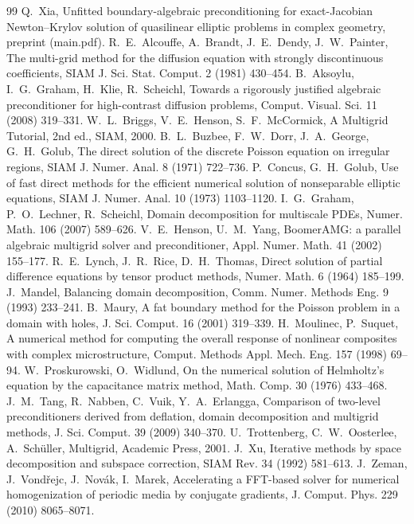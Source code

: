 \documentclass[11pt,a4paper]{ctexart}
\begin{document}
\begin{thebibliography}{99}\small
{} Q.~Xia, Unfitted boundary-algebraic preconditioning for exact-Jacobian Newton--Krylov solution of quasilinear elliptic problems in complex geometry, preprint (main.pdf).
 R.~E.~Alcouffe, A.~Brandt, J.~E.~Dendy, J.~W.~Painter, The multi-grid method for the diffusion equation with strongly discontinuous coefficients, SIAM J. Sci. Stat. Comput. 2 (1981) 430--454.
 B.~Aksoylu, I.~G.~Graham, H.~Klie, R.~Scheichl, Towards a rigorously justified algebraic preconditioner for high-contrast diffusion problems, Comput. Visual. Sci. 11 (2008) 319--331.
 W.~L.~Briggs, V.~E.~Henson, S.~F.~McCormick, A Multigrid Tutorial, 2nd ed., SIAM, 2000.
 B.~L.~Buzbee, F.~W.~Dorr, J.~A.~George, G.~H.~Golub, The direct solution of the discrete Poisson equation on irregular regions, SIAM J. Numer. Anal. 8 (1971) 722--736.
 P.~Concus, G.~H.~Golub, Use of fast direct methods for the efficient numerical solution of nonseparable elliptic equations, SIAM J. Numer. Anal. 10 (1973) 1103--1120.
 I.~G.~Graham, P.~O.~Lechner, R.~Scheichl, Domain decomposition for multiscale PDEs, Numer. Math. 106 (2007) 589--626.
 V.~E.~Henson, U.~M.~Yang, BoomerAMG: a parallel algebraic multigrid solver and preconditioner, Appl. Numer. Math. 41 (2002) 155--177.
 R.~E.~Lynch, J.~R.~Rice, D.~H.~Thomas, Direct solution of partial difference equations by tensor product methods, Numer. Math. 6 (1964) 185--199.
 J.~Mandel, Balancing domain decomposition, Comm. Numer. Methods Eng. 9 (1993) 233--241.
 B.~Maury, A fat boundary method for the Poisson problem in a domain with holes, J. Sci. Comput. 16 (2001) 319--339.
 H.~Moulinec, P.~Suquet, A numerical method for computing the overall response of nonlinear composites with complex microstructure, Comput. Methods Appl. Mech. Eng. 157 (1998) 69--94.
 W.~Proskurowski, O.~Widlund, On the numerical solution of Helmholtz's equation by the capacitance matrix method, Math. Comp. 30 (1976) 433--468.
 J.~M.~Tang, R.~Nabben, C.~Vuik, Y.~A.~Erlangga, Comparison of two-level preconditioners derived from deflation, domain decomposition and multigrid methods, J. Sci. Comput. 39 (2009) 340--370.
 U.~Trottenberg, C.~W.~Oosterlee, A.~Sch\"uller, Multigrid, Academic Press, 2001.
 J.~Xu, Iterative methods by space decomposition and subspace correction, SIAM Rev. 34 (1992) 581--613.
 J.~Zeman, J.~Vond\v{r}ejc, J.~Nov\'ak, I.~Marek, Accelerating a FFT-based solver for numerical homogenization of periodic media by conjugate gradients, J. Comput. Phys. 229 (2010) 8065--8071.
\end{thebibliography}
\end{document}
